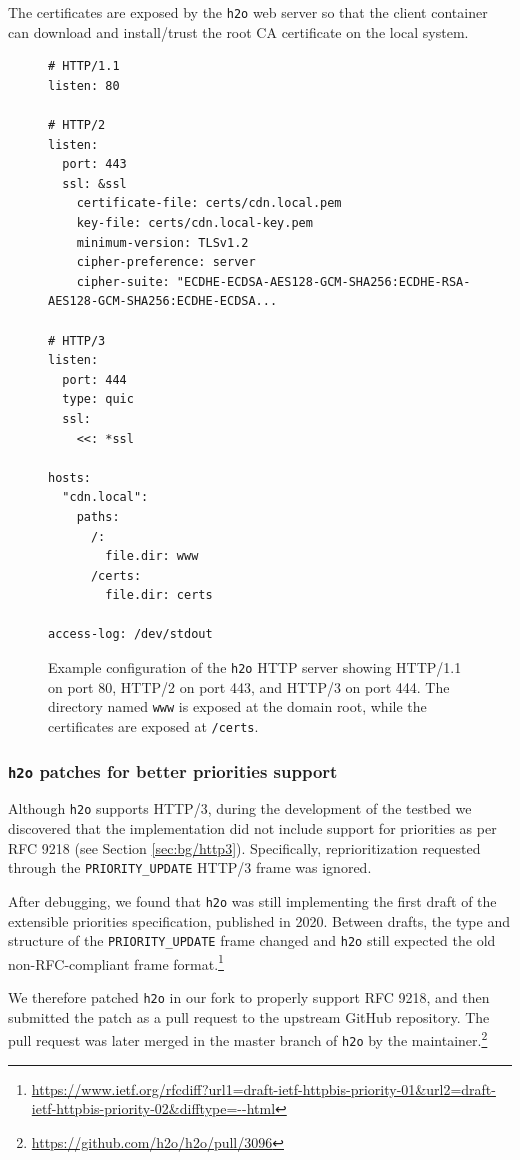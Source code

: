 The certificates are exposed by the \texttt{h2o} web server so that the client container can download and install/trust the root CA certificate on the local system.

\begin{figure}
    \centering
    \begin{verbatim}
# HTTP/1.1
listen: 80

# HTTP/2
listen:
  port: 443
  ssl: &ssl
    certificate-file: certs/cdn.local.pem
    key-file: certs/cdn.local-key.pem
    minimum-version: TLSv1.2
    cipher-preference: server
    cipher-suite: "ECDHE-ECDSA-AES128-GCM-SHA256:ECDHE-RSA-AES128-GCM-SHA256:ECDHE-ECDSA...

# HTTP/3
listen:
  port: 444
  type: quic
  ssl:
    <<: *ssl

hosts:
  "cdn.local":
    paths:
      /:
        file.dir: www
      /certs:
        file.dir: certs

access-log: /dev/stdout
    \end{verbatim}
    \caption{Example configuration of the \texttt{h2o} HTTP server showing HTTP/1.1 on port 80, HTTP/2 on port 443, and HTTP/3 on port 444. The directory named \texttt{www} is exposed at the domain root, while the certificates are exposed at \texttt{/certs}.}
    \label{fig:h2o}
\end{figure}

\subsubsection{\texttt{h2o} patches for better priorities support}
\label{sec:eval/testbed/cdn/h2o}

Although \texttt{h2o} supports HTTP/3, during the development of the testbed we discovered that the implementation did not include support for priorities as per RFC 9218 (see Section \ref{sec:bg/http3}). Specifically, reprioritization requested through the \texttt{PRIORITY\_UPDATE} HTTP/3 frame was ignored.

After debugging, we found that \texttt{h2o} was still implementing the first draft of the extensible priorities specification, published in 2020. Between drafts, the type and structure of the \texttt{PRIORITY\_UPDATE} frame changed and \texttt{h2o} still expected the old non-RFC-compliant frame format.\footnote{\url{https://www.ietf.org/rfcdiff?url1=draft-ietf-httpbis-priority-01&url2=draft-ietf-httpbis-priority-02&difftype=--html}}

We therefore patched \texttt{h2o} in our fork to properly support RFC 9218, and then submitted the patch as a pull request to the upstream GitHub repository. The pull request was later merged in the master branch of \texttt{h2o} by the maintainer.\footnote{\url{https://github.com/h2o/h2o/pull/3096}}

